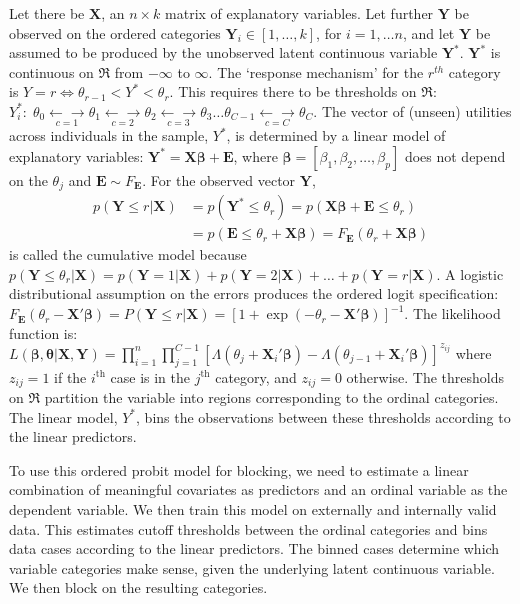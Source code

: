 \documentclass[12pt,econ]{sources/authesis}
\begin{document}
Let there be \(\bm{X}\), an \(n \times k\) matrix of explanatory variables. Let further \(\bm{Y}\) be observed on the ordered categories \(\bm{Y}_i \in [1,\ldots,k]\), for \(i=1,\ldots n\), and let \(\bm{Y}\) be assumed to be produced by the unobserved latent continuous variable \(\bm{Y^*}\). \(\bm{Y^*}\) is continuous on \(\mathfrak{R}\) from \(-\infty\) to \(\infty\). The `response mechanism' for the \(r^{th}\) category is \(Y=r \Longleftrightarrow \theta_{r-1} < Y^* < \theta_r\). This requires there to be thresholds on \(\mathfrak{R}\):
\(Y^*_i: \; \theta_0 \underset{c=1}{\longleftarrow\!\longrightarrow} \theta_1 \underset{c=2}{\longleftarrow\!\longrightarrow} \theta_2 \underset{c=3}{\longleftarrow\!\longrightarrow} \theta_3\ldots \theta_{C-1} \underset{c=C}{\longleftarrow\!\longrightarrow} \theta_C\). The vector of (unseen) utilities across individuals in the sample, \(Y^*\), is determined by a linear model of explanatory variables: \(\bm{Y^*} = \bm{X} \bm{\beta} + \mathbf{E}\), where \(\bm{\beta} =[\beta_1,\beta_2,\ldots,\beta_p]\) does not depend on the \(\theta_j\) and \(\mathbf{E} \sim F_{\mathbf{E}}\). For the observed vector \(\bm{Y}\),
\begin{align*}
                     p(\bm{Y} \leq r|\bm{X}) &= p(\bm{Y^*} \leq \theta_r) = p(\bm{X}\bm{\beta} + \mathbf{E} \leq \theta_r)\\
                                      &= p(\mathbf{E} \leq \theta_r+\bm{X}\bm{\beta}) = F_{\mathbf{E}}(\theta_r + \bm{X}\bm{\beta})
            \end{align*}
is called the cumulative model because \(p(\bm{Y} \leq \theta_r|\bm{X}) = p(\bm{Y}=1|\bm{X}) + p(\bm{Y}=2|\bm{X}) + \ldots + p(\bm{Y}=r|\bm{X})\). A logistic distributional assumption on the errors produces the ordered logit specification: \(F_{\mathbf{E}}(\theta_r - \bm{X}'\bm{\beta}) = P(\bm{Y} \leq r|\bm{X}) = [1+\exp(-\theta_r-\bm{X}'\bm{\beta})]^{-1}\). The likelihood function is: \(L(\bm{\beta},\bm{\theta}|\bm{X},\bm{Y}) = \prod_{i=1}^{n}\prod_{j=1}^{C-1}\left[\Lambda(\theta_j + \bm{X}_i'\bm{\beta}) - \Lambda(\theta_{j-1} + \bm{X}_i'\bm{\beta}) \right]^{z_{ij}}\) where \(z_{ij}=1\) if the \(i^\text{th}\) case is in the \(j^\text{th}\) category, and \(z_{ij}=0\) otherwise. The thresholds on \(\mathfrak{R}\) partition the variable into regions corresponding to the ordinal categories. The linear model, \(Y^*\), bins the observations between these thresholds according to the linear predictors.

To use this ordered probit model for blocking, we need to estimate a linear combination of meaningful covariates as predictors and an ordinal variable as the dependent variable. We then train this model on externally and internally valid data. This estimates cutoff thresholds between the ordinal categories and bins data cases according to the linear predictors. The binned cases determine which variable categories make sense, given the underlying latent continuous variable. We then block on the resulting categories.
\end{document}
